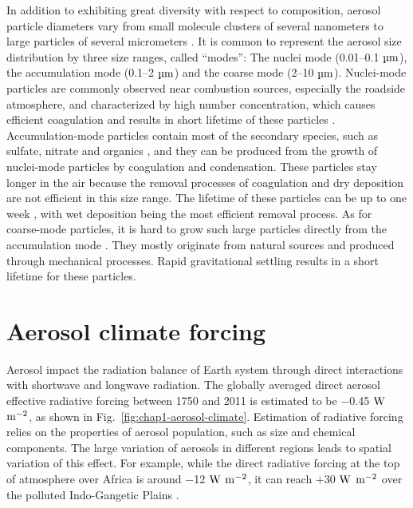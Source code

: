 \documentclass[edeposit,fullpage]{uiucthesis2009}
\begin{document}

In addition to exhibiting great diversity with respect to composition,
aerosol particle diameters vary from small molecule clusters of
several nanometers to large particles of several micrometers
\citep{MCMURRY200320}. It is common to represent the aerosol size
distribution by three size ranges, called ``modes'': The nuclei mode
(0.01--0.1 $\rm \mu m$), the accumulation mode (0.1--2 $\rm \mu m$)
and the coarse mode (2--10 $ \rm \mu m$). Nuclei-mode particles are
commonly observed near combustion sources, especially the roadside
atmosphere, and characterized by high number concentration, which
causes efficient coagulation and results in short lifetime of these
particles \citep{fushimi2008atmospheric}. Accumulation-mode particles
contain most of the secondary species, such as sulfate, nitrate and
organics \citep{zhang2005time}, and they can be produced from the
growth of nuclei-mode particles by coagulation and condensation. These
particles stay longer in the air because the removal processes of
coagulation and dry deposition are not efficient in this size range.
The lifetime of these particles can be up to one week
\citep{feichter2009climate}, with wet deposition being the most
efficient removal process. As for coarse-mode particles, it is hard to
grow such large particles directly from the accumulation mode
\citep{friedlander1991scavenging, lee2005size}. They mostly originate
from natural sources and produced through mechanical processes. Rapid
gravitational settling results in a short lifetime for these
particles.

\section{Aerosol climate forcing}
\label{cha1-2:aerosl-climate}
Aerosol impact the radiation balance of Earth system through direct
interactions with shortwave and longwave radiation. The globally
averaged direct aerosol effective radiative forcing between 1750 and
2011 is estimated to be $-$0.45 $\rm W$ $\rm m^{-2}$, as shown
in Fig.~\ref{fig:chap1-aerosol-climate}. Estimation of radiative
forcing relies on the properties of aerosol population, such as size
and chemical components. The large variation of aerosols in different
regions leads to spatial variation of this effect. For example, while
the direct radiative forcing at the top of atmosphere over Africa is
around $-$12 $\rm W$ $\rm m^{-2}$, it can reach $+$30 $\rm W$ $\rm
m^{-2}$ over the polluted Indo-Gangetic Plains
\citep{subba2020recent}.
\end{document}

